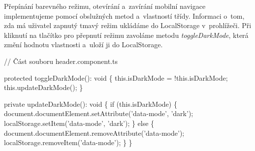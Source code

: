Přepínání barevného režimu, otevírání a~zavírání mobilní navigace implementujeme pomocí obslužných metod a~vlastností třídy. 
Informaci o~tom, zda má uživatel zapnutý tmavý režim ukládáme do LocalStorage v~prohlížeči. 
Při kliknutí na tlačítko pro přepnutí režimu zavoláme metodu \emph{toggleDarkMode}, která změní hodnotu vlastnosti a~uloží ji do LocalStorage.

\begin{prog}
// Část souboru header.component.ts

protected toggleDarkMode(): void \{
  this.isDarkMode = !this.isDarkMode;
  this.updateDarkMode();
\}

private updateDarkMode(): void \{
  if (this.isDarkMode) \{
    document.documentElement.setAttribute('data-mode', 'dark');
    localStorage.setItem('data-mode', 'dark');
  \} else \{
    document.documentElement.removeAttribute('data-mode');
    localStorage.removeItem('data-mode');
  \}
\}
\end{prog}